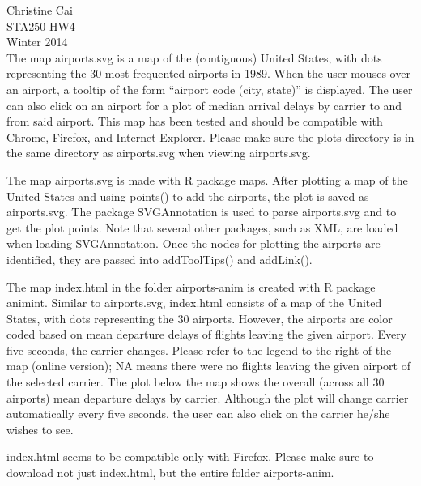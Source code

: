 \documentclass[12pt]{article}
\begin{document}
\noindent Christine Cai\\
STA250 HW4\\
Winter 2014\\

The map airports.svg is a map of the (contiguous) United States, with dots representing the 30 most frequented airports in 1989. When the user mouses over an airport, a tooltip of the form ``airport code (city, state)'' is displayed. The user can also click on an airport for a plot of median arrival delays by carrier to and from said airport. This map has been tested and should be compatible with Chrome, Firefox, and Internet Explorer. Please make sure the plots directory is in the same directory as airports.svg when viewing airports.svg.

The map airports.svg is made with R package maps. After plotting a map of the United States and using points() to add the airports, the plot is saved as airports.svg. The package SVGAnnotation is used to parse airports.svg and to get the plot points. Note that several other packages, such as XML, are loaded when loading SVGAnnotation. Once the nodes for plotting the airports are identified, they are passed into addToolTips() and addLink().

The map index.html in the folder airports-anim is created with R package animint. Similar to airports.svg, index.html consists of a map of the United States, with dots representing the 30 airports. However, the airports are color coded based on mean departure delays of flights leaving the given airport. Every five seconds, the carrier changes. Please refer to the legend to the right of the map (online version); NA means there were no flights leaving the given airport of the selected carrier. The plot below the map shows the overall (across all 30 airports) mean departure delays by carrier. Although the plot will change carrier automatically every five seconds, the user can also click on the carrier he/she wishes to see.

index.html seems to be compatible only with Firefox. Please make sure to download not just index.html, but the entire folder airports-anim.
\end{document}
